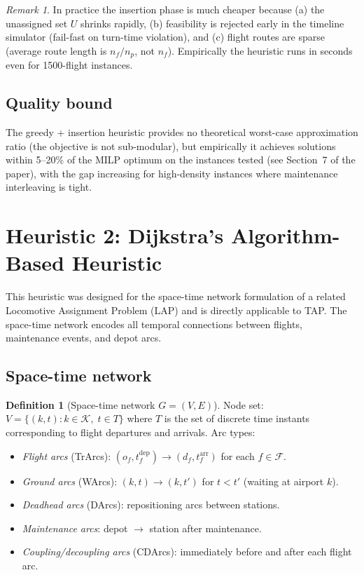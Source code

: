 \documentclass[11pt, a4paper]{article}
\theoremstyle{plain}
\theoremstyle{definition}
\newtheorem{definition}{Definition}
\theoremstyle{remark}
\newtheorem{remark}{Remark}
\newcommand{\F}{\mathcal{F}}
\newcommand{\K}{\mathcal{K}}
\begin{document}
\begin{remark}
  In practice the insertion phase is much cheaper because (a) the unassigned
  set $U$ shrinks rapidly, (b) feasibility is rejected early in the timeline
  simulator (fail-fast on turn-time violation), and (c) flight routes are
  sparse (average route length is $n_f / n_p$, not $n_f$).  Empirically the
  heuristic runs in seconds even for 1500-flight instances.
\end{remark}

\subsection{Quality bound}

The greedy + insertion heuristic provides no theoretical worst-case
approximation ratio (the objective is not sub-modular), but empirically it
achieves solutions within 5--20\% of the MILP optimum on the instances tested
(see Section~7 of the paper), with the gap increasing for high-density
instances where maintenance interleaving is tight.

\section{Heuristic 2: Dijkstra's Algorithm-Based Heuristic}

This heuristic was designed for the space-time network formulation of a
related Locomotive Assignment Problem (LAP) and is directly applicable to
TAP.  The space-time network encodes all temporal connections between flights,
maintenance events, and depot arcs.

\subsection{Space-time network}

\begin{definition}[Space-time network $G = (V, E)$]
  Node set: $V = \{(k, t) : k \in \K,\; t \in T\}$ where $T$ is the set of
  discrete time instants corresponding to flight departures and arrivals.
  Arc types:
  \begin{itemize}[leftmargin=1.4em]
    \item \emph{Flight arcs} (TrArcs): $(o_f, t_f^{\mathrm{dep}}) \to
      (d_f, t_f^{\mathrm{arr}})$ for each $f \in \F$.
    \item \emph{Ground arcs} (WArcs): $(k, t) \to (k, t')$ for $t < t'$
      (waiting at airport $k$).
    \item \emph{Deadhead arcs} (DArcs): repositioning arcs between stations.
    \item \emph{Maintenance arcs}: depot $\to$ station after maintenance.
    \item \emph{Coupling/decoupling arcs} (CDArcs): immediately before and
      after each flight arc.
  \end{itemize}
\end{definition}
\end{document}

